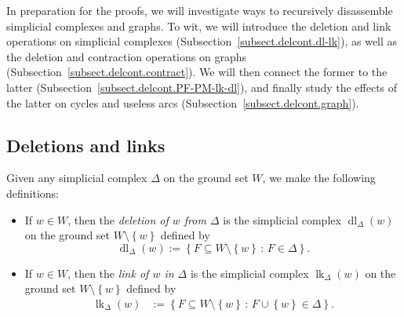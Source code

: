 \documentclass[12pt]{amsart}
\theoremstyle{definition}
\newcommand{\with}{\,\colon\,}
\DeclareMathOperator{\lk}{lk}
\DeclareMathOperator{\dl}{dl}
\DeclareMathOperator{\st}{st}
\newcommand{\set}[1]{\left\{ #1 \right\}}
\begin{document}
In preparation for the proofs, we will investigate ways to recursively disassemble simplicial complexes and graphs.
To wit, we will introduce the deletion and link operations on simplicial complexes (Subsection~\ref{subsect.delcont.dl-lk}), as well as the deletion and contraction operations on graphs (Subsection~\ref{subsect.delcont.contract}).
We will then connect the former to the latter (Subsection~\ref{subsect.delcont.PF-PM-lk-dl}), and finally study the effects of the latter on cycles and useless arcs (Subsection~\ref{subsect.delcont.graph}).

\subsection{\label{subsect.delcont.dl-lk}Deletions and links}

Given any simplicial complex $\Delta$ on the ground set $W$, we make the following definitions:

\begin{itemize}


\item If $w \in W$, then
      the \emph{deletion of $w$ from $\Delta$} is the simplicial complex
      $\dl_\Delta(w)$ on the ground set $W \setminus \set{w}$ defined by
      \[
      \dl_\Delta(w) := \set{F \subseteq W \setminus \set{w} \with F \in \Delta } .
      \]


\item If $w \in W$, then
      the \emph{link of $w$ in $\Delta$} is the simplicial complex
      $\lk_\Delta(w)$ on the ground set $W \setminus \set{w}$ defined by
      \begin{align*}
      \lk_\Delta(w)
      &:= \set{F \subseteq W \setminus \set{w} \with F \cup \set{w} \in \Delta } . %
      \end{align*}
\end{itemize}
\end{document}
